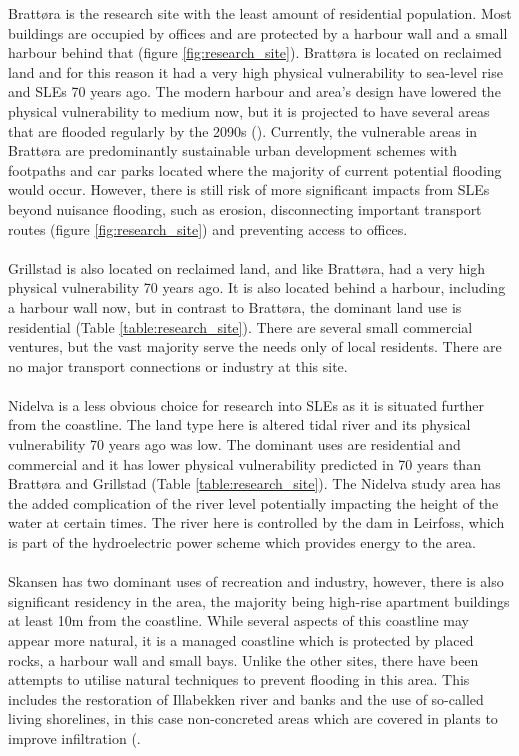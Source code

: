 Brattøra is the research site with the least amount of residential population. Most buildings are occupied by offices and are protected by a harbour wall and a small harbour behind that (figure \ref{fig:research_site}). Brattøra is located on reclaimed land and for this reason it had a very high physical vulnerability to sea-level rise and SLEs 70 years ago. The modern harbour and area's design have lowered the physical vulnerability to medium now, but it is projected to have several areas that are flooded regularly by the 2090s (\cite{kartverket_se_2021}). Currently, the vulnerable areas in Brattøra are predominantly sustainable urban development schemes with footpaths and car parks located where the majority of current potential flooding would occur. However, there is still risk of more significant impacts from SLEs beyond nuisance flooding, such as erosion, disconnecting important transport routes (figure \ref{fig:research_site}) and preventing access to offices.
\paragraph{}
Grillstad is also located on reclaimed land, and like Brattøra, had a very high physical vulnerability 70 years ago. It is also located behind a harbour, including a harbour wall now, but in contrast to  Brattøra, the dominant land use is residential (Table \ref{table:research_site}). There are several small commercial ventures, but the vast majority serve the needs only of local residents. There are no major transport connections or industry at this site. 
\paragraph{}
Nidelva is a less obvious choice for research into SLEs as it is situated further from the coastline. The land type here is altered tidal river and its physical vulnerability 70 years ago was low. The dominant uses are residential and commercial and it has lower physical vulnerability predicted in 70 years than Brattøra and Grillstad (Table \ref{table:research_site}). The Nidelva study area has the added complication of the river level potentially impacting the height of the water at certain times. The river here is controlled by the dam in Leirfoss, which is part of the hydroelectric power scheme which provides energy to the area.
\paragraph{}
Skansen has two dominant uses of recreation and industry, however, there is also significant residency in the area, the majority being high-rise apartment buildings at least 10m from the coastline. While several aspects of this coastline may appear more natural, it is a managed coastline which is protected by placed rocks, a harbour wall and small bays. Unlike the other sites, there have been attempts to utilise natural techniques to prevent flooding in this area. This includes the restoration of Illabekken river and banks and the use of so-called living shorelines, in this case non-concreted areas which are covered in plants to improve infiltration (\cite{selliseth_ilabekken_2021}.
